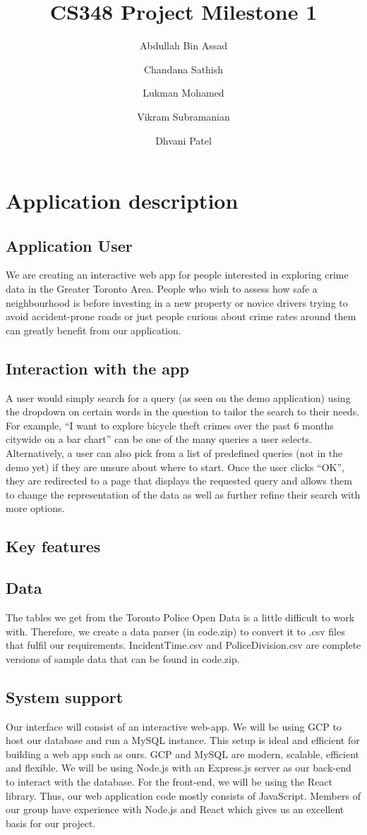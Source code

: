 \documentclass[12pt, a4paper]{article}
\title{CS348 Project Milestone 1}
\author{Abdullah Bin Assad\and Chandana Sathish \and Lukman Mohamed \and Vikram Subramanian \and Dhvani Patel}
\begin{document}
\maketitle

\section*{Application description}
\subsection*{Application User}
We are creating an interactive web app for people interested in exploring crime data in the Greater Toronto Area. People who wish to assess how safe a neighbourhood is before investing in a new property or novice drivers trying to avoid accident-prone roads or just people curious about crime rates around them can greatly benefit from our application.
\subsection*{Interaction with the app}
A user would simply search for a query (as seen on the demo application) using the dropdown on certain words in the question to tailor the search to their needs. For example, “I want to explore bicycle theft crimes over the past 6 months citywide on a bar chart” can be one of the many queries a user selects. Alternatively, a user can also pick from a list of predefined queries (not in the demo yet) if they are unsure about where to start. Once the user clicks “OK”, they are redirected to a page that displays the requested query and allows them to change the representation of the data as well as further refine their search with more options.
\subsection*{Key features}
\subsection*{Data}
The tables we get from the Toronto Police Open Data is a little difficult to work with. Therefore, we create a data parser (in code.zip) to convert it to .csv files that fulfil our requirements. IncidentTime.csv and PoliceDivision.csv are complete versions of sample data that can be found in code.zip.
\subsection*{System support}
Our interface will consist of an interactive web-app. We will be using GCP to host our database and run a MySQL instance. This setup is ideal and efficient for building a web app such as ours. GCP and MySQL are modern, scalable, efficient and flexible. We will be using Node.js with an Express.js server as our back-end to interact with the database. For the front-end, we will be using the React library. Thus, our web application code mostly consists of JavaScript. Members of our group have experience with Node.js and React which gives us an excellent basis for our project.
\end{document}
